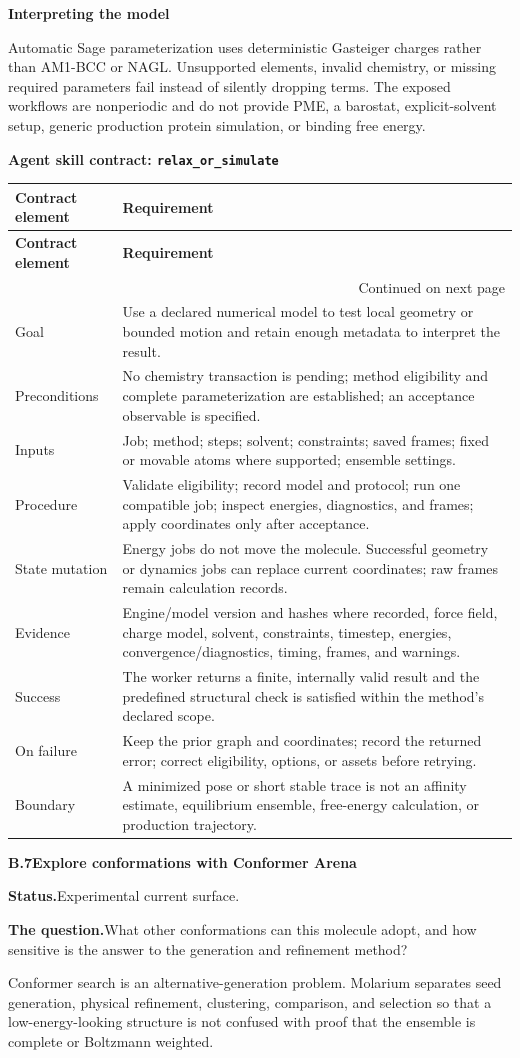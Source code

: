 \documentclass[10pt,letterpaper]{article}
\makeatletter
\newcommand{\code}[1]{\texttt{#1}}
\newcommand{\lead}[1]{\textbf{#1}\hspace{0.35em}}
\newcommand{\subhead}[1]{%
  \par\needspace{2\baselineskip}\vspace{2.5pt}%
  {\fontsize{10.91}{13.1}\selectfont\bfseries #1}\par\vspace{-1.5pt}}
\newcommand{\workflowsection}[4]{%
  \par\needspace{5\baselineskip}\vspace{7.5pt}%
  {\fontsize{10.91}{13.1}\selectfont\bfseries #1\hspace{1.1em}#2}\par\vspace{2pt}%
  \lead{Status.}#3.\par\vspace{-3.5pt}%
  \lead{The question.}#4\par}
\newenvironment{skillcontract}[1]{%
  \par\needspace{5\baselineskip}\vspace{2pt}%
  {\fontsize{10.91}{13.1}\selectfont\bfseries Agent skill contract: \code{#1}}\par\vspace{1pt}%
  \fontsize{8.4}{10}\selectfont
  \begin{longtable}{@{}K V@{}}
  \toprule
  \textbf{Contract element} & \textbf{Requirement}\\
  \midrule
  \endfirsthead
  \toprule
  \textbf{Contract element} & \textbf{Requirement}\\
  \midrule
  \endhead
  \midrule
  \multicolumn{2}{r}{\footnotesize Continued on next page}\\
  \endfoot
  \bottomrule
  \endlastfoot
}{%
  \end{longtable}
  \normalsize\fontsize{9.96}{11.95}\selectfont}
\newcommand{\contractrow}[2]{#1 & #2\\}
\makeatother
\begin{document}
\subhead{Interpreting the model}

Automatic Sage parameterization uses deterministic Gasteiger charges rather than AM1-BCC or NAGL. Unsupported elements, invalid chemistry, or missing required parameters fail instead of silently dropping terms. The exposed workflows are nonperiodic and do not provide PME, a barostat, explicit-solvent setup, generic production protein simulation, or binding free energy.

\begin{skillcontract}{relax\_or\_simulate}
\contractrow{Goal}{Use a declared numerical model to test local geometry or bounded motion and retain enough metadata to interpret the result.}
\contractrow{Preconditions}{No chemistry transaction is pending; method eligibility and complete parameterization are established; an acceptance observable is specified.}
\contractrow{Inputs}{Job; method; steps; solvent; constraints; saved frames; fixed or movable atoms where supported; ensemble settings.}
\contractrow{Procedure}{Validate eligibility; record model and protocol; run one compatible job; inspect energies, diagnostics, and frames; apply coordinates only after acceptance.}
\contractrow{State mutation}{Energy jobs do not move the molecule. Successful geometry or dynamics jobs can replace current coordinates; raw frames remain calculation records.}
\contractrow{Evidence}{Engine/model version and hashes where recorded, force field, charge model, solvent, constraints, timestep, energies, convergence/diagnostics, timing, frames, and warnings.}
\contractrow{Success}{The worker returns a finite, internally valid result and the predefined structural check is satisfied within the method's declared scope.}
\contractrow{On failure}{Keep the prior graph and coordinates; record the returned error; correct eligibility, options, or assets before retrying.}
\contractrow{Boundary}{A minimized pose or short stable trace is not an affinity estimate, equilibrium ensemble, free-energy calculation, or production trajectory.}
\end{skillcontract}

\workflowsection{B.7}{Explore conformations with Conformer Arena}{Experimental current surface}{What other conformations can this molecule adopt, and how sensitive is the answer to the generation and refinement method?}

Conformer search is an alternative-generation problem. Molarium separates seed generation, physical refinement, clustering, comparison, and selection so that a low-energy-looking structure is not confused with proof that the ensemble is complete or Boltzmann weighted.
\end{document}

